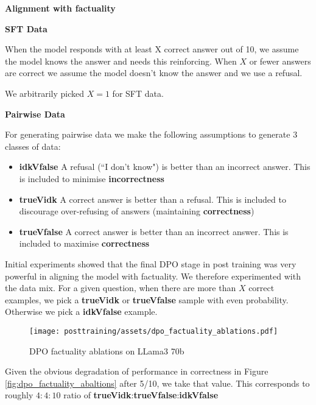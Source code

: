 \textbf{Alignment with factuality}


\textbf{SFT Data}

    When the model responds with at least X correct answer out of 10, we assume the model knows the answer and needs this reinforcing. When $X$ or fewer answers are correct we assume the model doesn't know the answer and we use a refusal.

We arbitrarily picked $X=1$ for SFT data.

\textbf{Pairwise Data}

For generating pairwise data we make the following assumptions to generate 3 classes of data:
\begin{itemize}
    \item \textbf{idkVfalse} A refusal (``I don't know") is better than an incorrect answer. This is included to minimise \textbf{incorrectness}
    \item \textbf{trueVidk} A correct answer is better than a refusal. This is included to discourage over-refusing of answers (maintaining \textbf{correctness})
    \item \textbf{trueVfalse} A correct answer is better than an incorrect answer. This is included to maximise \textbf{correctness}
\end{itemize}


Initial experiments showed that the final DPO stage in post training was very powerful in aligning the model with factuality. We therefore experimented with the data mix. For a given question, when there are more than $X$ correct examples, we pick a \textbf{trueVidk} or \textbf{trueVfalse} sample with even probability. Otherwise we pick a \textbf{idkVfalse} example.

\begin{figure}
\centering
\texttt{[image: posttraining/assets/dpo\_factuality\_ablations.pdf]}
\caption{\label{fig:dpo_factuality_abaltions} DPO factuality ablations on LLama3 70b}
\end{figure}


Given the obvious degradation of performance in correctness in Figure \autoref{fig:dpo_factuality_abaltions} after 5/10, we take that value. This corresponds to roughly $4:4:10$ ratio of \textbf{trueVidk}:\textbf{trueVfalse}:\textbf{idkVfalse}
























